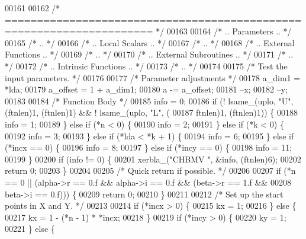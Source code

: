 \begin{DoxyCode}
00161 
00162 \textcolor{comment}{/*  ===================================================================== */}
00163 
00164 \textcolor{comment}{/*     .. Parameters .. */}
00165 \textcolor{comment}{/*     .. */}
00166 \textcolor{comment}{/*     .. Local Scalars .. */}
00167 \textcolor{comment}{/*     .. */}
00168 \textcolor{comment}{/*     .. External Functions .. */}
00169 \textcolor{comment}{/*     .. */}
00170 \textcolor{comment}{/*     .. External Subroutines .. */}
00171 \textcolor{comment}{/*     .. */}
00172 \textcolor{comment}{/*     .. Intrinsic Functions .. */}
00173 \textcolor{comment}{/*     .. */}
00174 
00175 \textcolor{comment}{/*     Test the input parameters. */}
00176 
00177     \textcolor{comment}{/* Parameter adjustments */}
00178     a\_dim1 = *lda;
00179     a\_offset = 1 + a\_dim1;
00180     a -= a\_offset;
00181     --x;
00182     --y;
00183 
00184     \textcolor{comment}{/* Function Body */}
00185     info = 0;
00186     \textcolor{keywordflow}{if} (! lsame\_(uplo, \textcolor{stringliteral}{"U"}, (ftnlen)1, (ftnlen)1) && ! lsame\_(uplo, \textcolor{stringliteral}{"L"}, (
00187         ftnlen)1, (ftnlen)1)) \{
00188     info = 1;
00189     \} \textcolor{keywordflow}{else} \textcolor{keywordflow}{if} (*n < 0) \{
00190     info = 2;
00191     \} \textcolor{keywordflow}{else} \textcolor{keywordflow}{if} (*k < 0) \{
00192     info = 3;
00193     \} \textcolor{keywordflow}{else} \textcolor{keywordflow}{if} (*lda < *k + 1) \{
00194     info = 6;
00195     \} \textcolor{keywordflow}{else} \textcolor{keywordflow}{if} (*incx == 0) \{
00196     info = 8;
00197     \} \textcolor{keywordflow}{else} \textcolor{keywordflow}{if} (*incy == 0) \{
00198     info = 11;
00199     \}
00200     \textcolor{keywordflow}{if} (info != 0) \{
00201     xerbla\_(\textcolor{stringliteral}{"CHBMV "}, &info, (ftnlen)6);
00202     \textcolor{keywordflow}{return} 0;
00203     \}
00204 
00205 \textcolor{comment}{/*     Quick return if possible. */}
00206 
00207     \textcolor{keywordflow}{if} (*n == 0 || (alpha->r == 0.f && alpha->i == 0.f && (beta->r == 1.f && 
00208                                                            beta->i == 0.f))) \{
00209     \textcolor{keywordflow}{return} 0;
00210     \}
00211 
00212 \textcolor{comment}{/*     Set up the start points in  X  and  Y. */}
00213 
00214     \textcolor{keywordflow}{if} (*incx > 0) \{
00215     kx = 1;
00216     \} \textcolor{keywordflow}{else} \{
00217     kx = 1 - (*n - 1) * *incx;
00218     \}
00219     \textcolor{keywordflow}{if} (*incy > 0) \{
00220     ky = 1;
00221     \} \textcolor{keywordflow}{else} \{

\end{DoxyCode}
